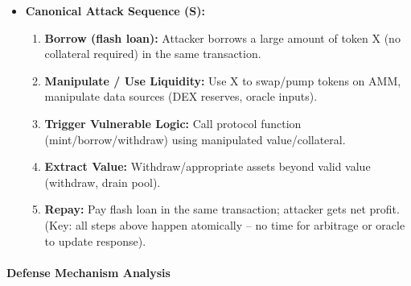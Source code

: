 \begin{itemize}
    \item \textbf{Canonical Attack Sequence (S):}
    \begin{enumerate}
        \item \textbf{Borrow (flash loan):} Attacker borrows a large amount of token X (no collateral required) in the same transaction.
        \item \textbf{Manipulate / Use Liquidity:} Use X to swap/pump tokens on AMM, manipulate data sources (DEX reserves, oracle inputs). \cite{werner2022sok}
        \item \textbf{Trigger Vulnerable Logic:} Call protocol function (mint/borrow/withdraw) using manipulated value/collateral. \cite{werapun2023faa}
        \item \textbf{Extract Value:} Withdraw/appropriate assets beyond valid value (withdraw, drain pool).
        \item \textbf{Repay:} Pay flash loan in the same transaction; attacker gets net profit. (Key: all steps above happen atomically -- no time for arbitrage or oracle to update response).
    \end{enumerate}
\end{itemize}

\paragraph{Defense Mechanism Analysis}

